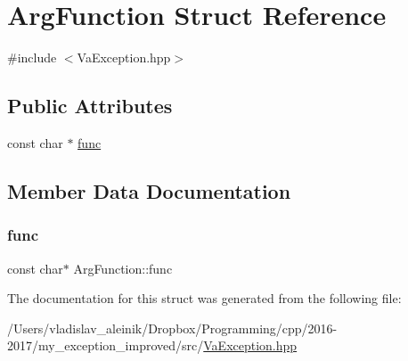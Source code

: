 \hypertarget{struct_arg_function}{}\section{Arg\+Function Struct Reference}
\label{struct_arg_function}


{\ttfamily \#include $<$Va\+Exception.\+hpp$>$}

\subsection*{Public Attributes}
\begin{DoxyCompactItemize}
\item 
const char $\ast$ \hyperlink{struct_arg_function_ae2bf8332cac9949e44a1f97ed4813d4c}{func}
\end{DoxyCompactItemize}


\subsection{Member Data Documentation}
\mbox{\label{struct_arg_function_ae2bf8332cac9949e44a1f97ed4813d4c}} 
\subsubsection{\texorpdfstring{func}{func}}
{\footnotesize\ttfamily const char$\ast$ Arg\+Function\+::func}



The documentation for this struct was generated from the following file\+:\begin{DoxyCompactItemize}
\item 
/\+Users/vladislav\+\_\+aleinik/\+Dropbox/\+Programming/cpp/2016-\/2017/my\+\_\+exception\+\_\+improved/src/\hyperlink{_va_exception_8hpp}{Va\+Exception.\+hpp}\end{DoxyCompactItemize}
